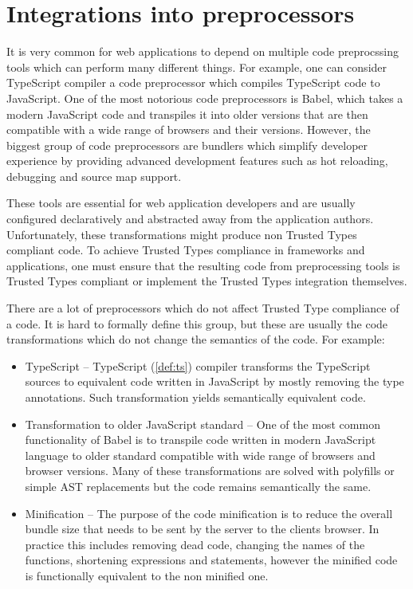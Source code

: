 \chapter{Integrations into preprocessors}

It is very common for web applications to depend on multiple code preprocssing tools which can
perform many different things. For example, one can consider TypeScript compiler a code preprocessor
which compiles TypeScript code to JavaScript. One of the most notorious code preprocessors is Babel,
which takes a modern JavaScript code and transpiles it into older versions that are then compatible
with a wide range of browsers and their versions. However, the biggest group of code preprocessors
are bundlers which simplify developer experience by providing advanced development features such as
hot reloading, debugging and source map support.

These tools are essential for web application developers and are usually configured declaratively
and abstracted away from the application authors. Unfortunately, these transformations might produce
non Trusted Types compliant code. To achieve Trusted Types compliance in frameworks and
applications, one must ensure that the resulting code from preprocessing tools is Trusted Types
compliant or implement the Trusted Types integration themselves.

There are a lot of preprocessors which do not affect Trusted Type compliance of a code. It is hard
to formally define this group, but these are usually the code transformations which do not change
the semantics of the code. For example:

\begin{itemize}
  \item TypeScript -- TypeScript (\ref{def:ts}) compiler transforms the TypeScript sources to
        equivalent code written in JavaScript by mostly removing the type annotations. Such
        transformation yields semantically equivalent code.
  \item Transformation to older JavaScript standard -- One of the most common functionality of Babel
        is to transpile code written in modern JavaScript language to older standard compatible with
        wide range of browsers and browser versions. Many of these transformations are solved with
        polyfills or simple AST replacements but the code remains semantically the same.
  \item Minification -- The purpose of the code minification is to reduce the
        overall bundle size that needs to be sent by the server to the clients browser. In practice
        this includes removing dead code, changing the names of the functions, shortening
        expressions and statements, however the minified code is functionally equivalent to the non
        minified one.
\end{itemize}


